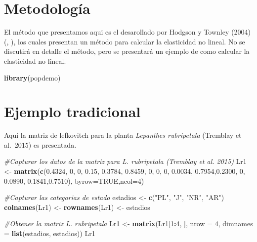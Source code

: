 \documentclass[
]{book}
\newenvironment{Shaded}{\begin{snugshade}}{\end{snugshade}}
\newcommand{\AttributeTok}[1]{\textcolor[rgb]{0.13,0.29,0.53}{#1}}
\newcommand{\CommentTok}[1]{\textcolor[rgb]{0.56,0.35,0.01}{\textit{#1}}}
\newcommand{\ConstantTok}[1]{\textcolor[rgb]{0.56,0.35,0.01}{#1}}
\newcommand{\DecValTok}[1]{\textcolor[rgb]{0.00,0.00,0.81}{#1}}
\newcommand{\FloatTok}[1]{\textcolor[rgb]{0.00,0.00,0.81}{#1}}
\newcommand{\FunctionTok}[1]{\textcolor[rgb]{0.13,0.29,0.53}{\textbf{#1}}}
\newcommand{\NormalTok}[1]{#1}
\newcommand{\OtherTok}[1]{\textcolor[rgb]{0.56,0.35,0.01}{#1}}
\newcommand{\SpecialCharTok}[1]{\textcolor[rgb]{0.81,0.36,0.00}{\textbf{#1}}}
\newcommand{\StringTok}[1]{\textcolor[rgb]{0.31,0.60,0.02}{#1}}
\theoremstyle{definition}
\theoremstyle{definition}
\theoremstyle{definition}
\theoremstyle{definition}
\theoremstyle{remark}
\begin{document}
\section{Metodología}\label{metodologuxeda}

El método que presentamos aqui es el desarollado por Hodgson y Townley (2004) (\citet{hodgson2004methodological}, \citet{stott2012beyond}), los cuales presentan un método para calcular la elasticidad no lineal. No se discutirá en detalle el método, pero se presentará un ejemplo de como calcular la elasticidad no lineal.

\begin{Shaded}
\begin{Highlighting}[]
\FunctionTok{library}\NormalTok{(popdemo)}
\end{Highlighting}
\end{Shaded}

\section{Ejemplo tradicional}\label{ejemplo-tradicional}

Aqui la matriz de lefkovitch para la planta \emph{Lepanthes rubripetala} (Tremblay et al.~2015) es presentada.

\begin{Shaded}
\begin{Highlighting}[]
\CommentTok{\#Capturar los datos de la matriz para L. rubripetala (Tremblay et al. 2015)}
\NormalTok{Lr1 }\OtherTok{\textless{}{-}} \FunctionTok{matrix}\NormalTok{(}\FunctionTok{c}\NormalTok{(}\FloatTok{0.4324}\NormalTok{, }\DecValTok{0}\NormalTok{,      }\DecValTok{0}\NormalTok{,     }\FloatTok{0.15}\NormalTok{,}
               \FloatTok{0.3784}\NormalTok{, }\FloatTok{0.8459}\NormalTok{, }\DecValTok{0}\NormalTok{,     }\DecValTok{0}\NormalTok{,}
               \DecValTok{0}\NormalTok{,      }\FloatTok{0.0034}\NormalTok{, }\FloatTok{0.7954}\NormalTok{,}\FloatTok{0.2300}\NormalTok{,}
               \DecValTok{0}\NormalTok{,      }\FloatTok{0.0890}\NormalTok{, }\FloatTok{0.1841}\NormalTok{,}\FloatTok{0.7510}\NormalTok{), }\AttributeTok{byrow=}\ConstantTok{TRUE}\NormalTok{,}\AttributeTok{ncol=}\DecValTok{4}\NormalTok{)}

\CommentTok{\#Capturar las categorias de estado}
\NormalTok{estadios }\OtherTok{\textless{}{-}} \FunctionTok{c}\NormalTok{(}\StringTok{"PL"}\NormalTok{, }\StringTok{"J"}\NormalTok{, }\StringTok{"NR"}\NormalTok{, }\StringTok{"AR"}\NormalTok{)}
\FunctionTok{colnames}\NormalTok{(Lr1) }\OtherTok{\textless{}{-}} \FunctionTok{rownames}\NormalTok{(Lr1) }\OtherTok{\textless{}{-}}\NormalTok{ estadios}

\CommentTok{\#Obtener la matriz L. rubripetala }
\NormalTok{Lr1 }\OtherTok{\textless{}{-}} \FunctionTok{matrix}\NormalTok{(Lr1[}\DecValTok{1}\SpecialCharTok{:}\DecValTok{4}\NormalTok{, ], }\AttributeTok{nrow =} \DecValTok{4}\NormalTok{, }\AttributeTok{dimnames =} \FunctionTok{list}\NormalTok{(estadios, estadios))}
\NormalTok{Lr1}
\end{Highlighting}
\end{Shaded}
\end{document}
